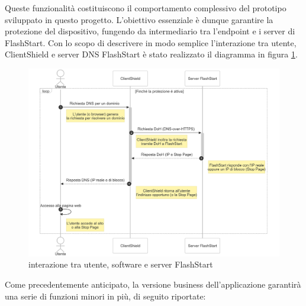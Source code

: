 \documentclass[12pt,a4paper,openright,twoside]{book}
\begin{document}
Queste funzionalità costituiscono il comportamento complessivo del prototipo sviluppato in questo progetto.
L'obiettivo essenziale è dunque garantire la protezione del dispositivo, fungendo da intermediario tra l'endpoint e i server di FlashStart.
Con lo scopo di descrivere in modo semplice l'interazione tra utente, ClientShield e server \gls{DNS} FlashStart è stato realizzato il diagramma in figura \ref{fig:interazione-utente-software-server}.

\begin{figure}[H]
	\centering
	\includegraphics[width=1.0\textwidth]{figures/schema-utente-software-server.png}
	\caption{interazione tra utente, software e server FlashStart}
	\label{fig:interazione-utente-software-server}
\end{figure}

Come precedentemente anticipato, la versione business dell'applicazione garantirà una serie di funzioni minori in più, di seguito riportate:
\end{document}
